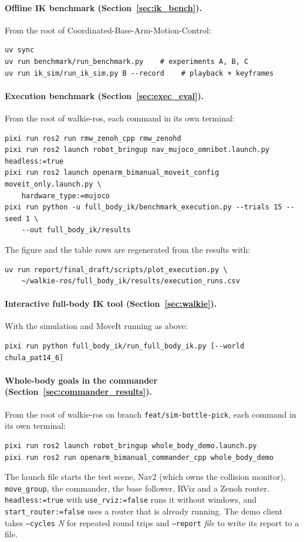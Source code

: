 \paragraph{Offline IK benchmark (Section~\ref{sec:ik_bench}).} From the root of Coordinated-Base-Arm-Motion-Control:
\begin{verbatim}
uv sync
uv run benchmark/run_benchmark.py    # experiments A, B, C
uv run ik_sim/run_ik_sim.py B --record    # playback + keyframes
\end{verbatim}

\paragraph{Execution benchmark (Section~\ref{sec:exec_eval}).} From the root of walkie-ros, each command
in its own terminal:
\begin{verbatim}
pixi run ros2 run rmw_zenoh_cpp rmw_zenohd
pixi run ros2 launch robot_bringup nav_mujoco_omnibot.launch.py headless:=true
pixi run ros2 launch openarm_bimanual_moveit_config moveit_only.launch.py \
    hardware_type:=mujoco
pixi run python -u full_body_ik/benchmark_execution.py --trials 15 --seed 1 \
    --out full_body_ik/results
\end{verbatim}
The figure and the table rows are regenerated from the results with:
\begin{verbatim}
uv run report/final_draft/scripts/plot_execution.py \
    ~/walkie-ros/full_body_ik/results/execution_runs.csv
\end{verbatim}

\paragraph{Interactive full-body IK tool (Section~\ref{sec:walkie}).} With the simulation and MoveIt
running as above:
\begin{verbatim}
pixi run python full_body_ik/run_full_body_ik.py [--world chula_pat14_6]
\end{verbatim}

\paragraph{Whole-body goals in the commander (Section~\ref{sec:commander_results}).} From the root of
walkie-ros on branch \texttt{feat/sim-bottle-pick}, each command in its own terminal:
\begin{verbatim}
pixi run ros2 launch robot_bringup whole_body_demo.launch.py
pixi run ros2 run openarm_bimanual_commander_cpp whole_body_demo
\end{verbatim}
The launch file starts the test scene, Nav2 (which owns the collision monitor), \texttt{move\_group},
the commander, the base follower, RViz and a Zenoh router. \texttt{headless:=true} with
\texttt{use\_rviz:=false} runs it without windows, and \texttt{start\_router:=false} uses a router that is already running. The
demo client takes \texttt{--cycles} \textit{N} for repeated round trips and \texttt{--report}
\textit{file} to write its report to a file.

